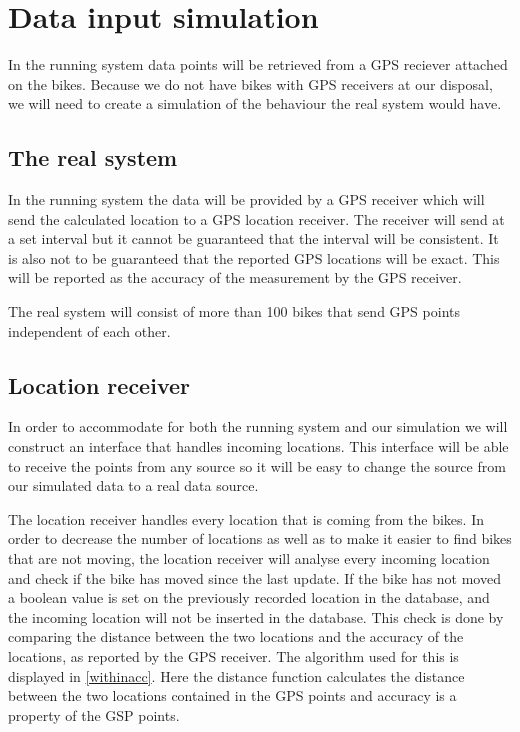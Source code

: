\section{Data input simulation}\label{design:datasimulation}
In the running system data points will be retrieved from a GPS reciever attached on the bikes.
Because we do not have bikes with GPS receivers at our disposal, we will need to create a simulation of the behaviour the real system would have.

\subsection{The real system}
In the running system the data will be provided by a GPS receiver which will send the calculated location to a GPS location receiver.
The receiver will send at a set interval but it cannot be guaranteed that the interval will be consistent.
It is also not to be guaranteed that the reported GPS locations will be exact.
This will be reported as the accuracy of the measurement by the GPS receiver.

The real system will consist of more than 100 bikes that send GPS points independent of each other.

\subsection{Location receiver}\label{design:datareceiver}
In order to accommodate for both the running system and our simulation we will construct an interface that handles incoming locations.
This interface will be able to receive the points from any source so it will be easy to change the source from our simulated data to a real data source.

The location receiver handles every location that is coming from the bikes.
In order to decrease the number of locations as well as to make it easier to find bikes that are not moving, the location receiver will analyse every incoming location and check if the bike has moved since the last update.
If the bike has not moved a boolean value is set on the previously recorded location in the database, and the incoming location will not be inserted in the database.
This check is done by comparing the distance between the two locations and the accuracy of the locations, as reported by the GPS receiver.
The algorithm used for this is displayed in \cref{withinacc}.
Here the distance function calculates the distance between the two locations contained in the GPS points and accuracy is a property of the GSP points.

